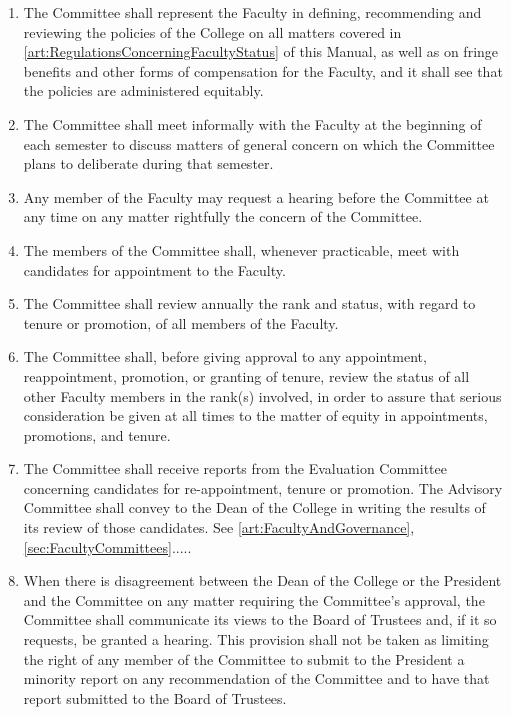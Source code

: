 \documentclass{manual}
\newcommand{\itemLevelA}{\alph*.}
\newcommand{\itemLevelB}{\arabic*)}
\newcommand{\itemRefA}{\alph*}
\newcommand{\itemRefB}{\arabic*}
\begin{document}
\begin{enumerate}[label=\itemLevelA,ref=\itemRefA]
					\begin{enumerate}[label=\itemLevelB,ref=\itemRefB]
					\item The Committee shall represent the Faculty in defining, recommending and reviewing the policies of the College on all matters covered in \cref{art:RegulationsConcerningFacultyStatus} of this Manual, as well as on fringe benefits and other forms of compensation for the Faculty, and it shall see that the policies are administered equitably.
					\item The Committee shall meet informally with the Faculty at the beginning of each semester to discuss matters of general concern on which the Committee plans to deliberate during that semester.
					\item Any member of the Faculty may request a hearing before the Committee at any time on any matter rightfully the concern of the Committee.
					\item The members of the Committee shall, whenever practicable, meet with candidates for appointment to the Faculty.
					\item The Committee shall review annually the rank and status, with regard to tenure or promotion, of all members of the Faculty.
					\item The Committee shall, before giving approval to any appointment, reappointment, promotion, or granting of tenure, review the status of all other Faculty members in the rank(s) involved, in order to assure that serious consideration be given at all times to the matter of equity in appointments, promotions, and tenure.
					\item The Committee shall receive reports from the Evaluation Committee concerning candidates for re-appointment, tenure or promotion. The Advisory Committee shall convey to the Dean of the College in writing the results of its review of those candidates. See \cref{art:FacultyAndGovernance}, \cref{sec:FacultyCommittees}.....
					\item When there is disagreement between the Dean of the College or the President and the Committee on any matter requiring the Committee's approval, the Committee shall communicate its views to the Board of Trustees and, if it so requests, be granted a hearing. This provision shall not be taken as limiting the right of any member of the Committee to submit to the President a minority report on any recommendation of the Committee and to have that report submitted to the Board of Trustees.

\end{enumerate}
\end{enumerate}
\end{document}
